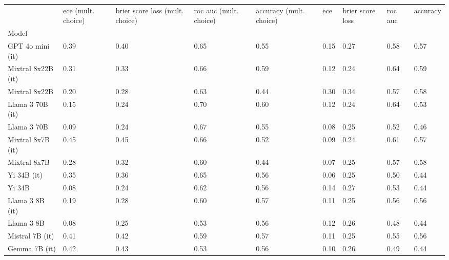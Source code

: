 \begin{tabular}{lllllllll}
\toprule
 & ece (mult. choice) & brier score loss (mult. choice) & roc auc (mult. choice) & accuracy (mult. choice) & ece & brier score loss & roc auc & accuracy \\
Model &  &  &  &  &  &  &  &  \\
\midrule
GPT 4o mini (it) & 0.39 & 0.40 & 0.65 & 0.55 & 0.15 & 0.27 & 0.58 & 0.57 \\
Mixtral 8x22B (it) & 0.31 & 0.33 & 0.66 & \cellcolor{cyan!17.1} 0.59 & 0.12 & \cellcolor{cyan!23.7} 0.24 & \cellcolor{cyan!23.5} 0.64 & \cellcolor{cyan!25.0} 0.59 \\
Mixtral 8x22B & 0.20 & 0.28 & 0.63 & \cellcolor{orange!25.0} 0.44 & 0.30 & 0.34 & 0.57 & \cellcolor{cyan!2.4} 0.58 \\
Llama 3 70B (it) & 0.15 & \cellcolor{cyan!22.6} 0.24 & \cellcolor{cyan!25.0} 0.70 & \cellcolor{cyan!25.0} 0.60 & 0.12 & \cellcolor{cyan!22.5} 0.24 & \cellcolor{cyan!25.0} 0.64 & 0.53 \\
Llama 3 70B & 0.09 & \cellcolor{cyan!21.4} 0.24 & 0.67 & 0.55 & 0.08 & \cellcolor{cyan!12.4} 0.25 & 0.52 & 0.46 \\
Mixtral 8x7B (it) & \cellcolor{orange!25.0} 0.45 & \cellcolor{orange!25.0} 0.45 & 0.66 & 0.52 & 0.09 & \cellcolor{cyan!25.0} 0.24 & 0.61 & 0.57 \\
Mixtral 8x7B & 0.28 & 0.32 & 0.60 & \cellcolor{orange!25.0} 0.44 & 0.07 & \cellcolor{cyan!16.2} 0.25 & 0.57 & \cellcolor{cyan!2.4} 0.58 \\
Yi 34B (it) & 0.35 & 0.36 & 0.65 & 0.56 & \cellcolor{cyan!3.7} 0.06 & \cellcolor{cyan!11.2} 0.25 & 0.50 & \cellcolor{orange!25.0} 0.44 \\
Yi 34B & \cellcolor{cyan!4.5} 0.08 & \cellcolor{cyan!25.0} 0.24 & 0.62 & 0.56 & 0.14 & 0.27 & 0.53 & \cellcolor{orange!25.0} 0.44 \\
Llama 3 8B (it) & 0.19 & 0.28 & 0.60 & 0.57 & 0.11 & \cellcolor{cyan!12.4} 0.25 & 0.56 & 0.56 \\
Llama 3 8B & 0.08 & \cellcolor{cyan!7.1} 0.25 & 0.53 & 0.56 & 0.12 & 0.26 & \cellcolor{orange!25.0} 0.48 & \cellcolor{orange!25.0} 0.44 \\
Mistral 7B (it) & \cellcolor{orange!2.7} 0.41 & 0.42 & 0.59 & 0.57 & 0.11 & \cellcolor{cyan!11.2} 0.25 & 0.55 & 0.56 \\
Gemma 7B (it) & \cellcolor{orange!12.0} 0.42 & 0.43 & 0.53 & 0.56 & 0.10 & \cellcolor{cyan!4.9} 0.26 & \cellcolor{orange!4.9} 0.49 & \cellcolor{orange!25.0} 0.44 \\

\end{tabular}
